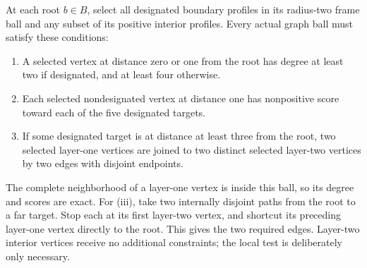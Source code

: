 At each root $b\in B$, select all designated boundary profiles in its
radius-two frame ball and any subset of its positive interior profiles.
Every actual graph ball must satisfy these conditions:
\begin{enumerate}[label=(\roman*)]
\item A selected vertex at distance zero or one from the root has degree
at least two if designated, and at least four otherwise.
\item Each selected nondesignated vertex at distance one has nonpositive
score toward each of the five designated targets.
\item If some designated target is at distance at least three from the
root, two selected layer-one vertices are joined to two distinct selected
layer-two vertices by two edges with disjoint endpoints.
\end{enumerate}
The complete neighborhood of a layer-one vertex is inside this ball, so
its degree and scores are exact. For (iii), take two internally disjoint
paths from the root to a far target. Stop each at its first layer-two
vertex, and shortcut its preceding layer-one vertex directly to the root.
This gives the two required edges. Layer-two interior vertices receive
no additional constraints; the local test is deliberately only necessary.

